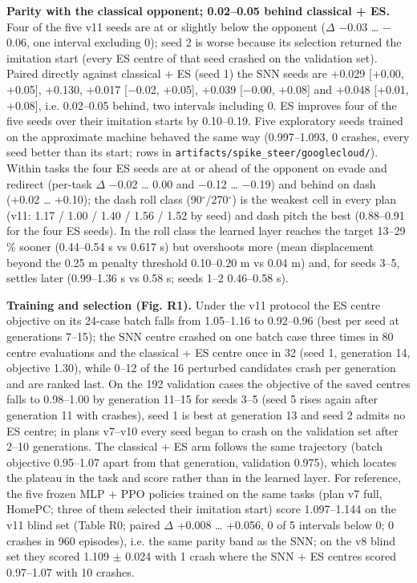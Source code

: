 \documentclass[10pt,a4paper]{article}
\begin{document}
\textbf{Parity with the classical opponent; 0.02--0.05 behind classical + ES.} Four of the five v11 seeds are at or slightly below the opponent ($\Delta$ $-$0.03 \ldots{} $-$0.06, one interval excluding 0); seed 2 is worse because its selection returned the imitation start (every ES centre of that seed crashed on the validation set). Paired directly against classical + ES (seed 1) the SNN seeds are +0.029 [+0.00, +0.05], +0.130, +0.017 [$-$0.02, +0.05], +0.039 [$-$0.00, +0.08] and +0.048 [+0.01, +0.08], i.e. 0.02--0.05 behind, two intervals including 0. ES improves four of the five seeds over their imitation starts by 0.10--0.19. Five exploratory seeds trained on the approximate machine behaved the same way (0.997--1.093, 0 crashes, every seed better than its start; rows in \texttt{artifacts/spike\_steer/googlecloud/}). Within tasks the four ES seeds are at or ahead of the opponent on evade and redirect (per-task $\Delta$ $-$0.02 \ldots{} 0.00 and $-$0.12 \ldots{} $-$0.19) and behind on dash (+0.02 \ldots{} +0.10); the dash roll class (90$^\circ$/270$^\circ$) is the weakest cell in every plan (v11: 1.17 / 1.00 / 1.40 / 1.56 / 1.52 by seed) and dash pitch the best (0.88--0.91 for the four ES seeds). In the roll class the learned layer reaches the target 13--29 \% sooner (0.44--0.54 s vs 0.617 s) but overshoots more (mean displacement beyond the 0.25 m penalty threshold 0.10--0.20 m vs 0.04 m) and, for seeds 3--5, settles later (0.99--1.36 s vs 0.58 s; seeds 1--2 0.46--0.58 s).

\textbf{Training and selection (Fig. R1).} Under the v11 protocol the ES centre objective on its 24-case batch falls from 1.05--1.16 to 0.92--0.96 (best per seed at generations 7--15); the SNN centre crashed on one batch case three times in 80 centre evaluations and the classical + ES centre once in 32 (seed 1, generation 14, objective 1.30), while 0--12 of the 16 perturbed candidates crash per generation and are ranked last. On the 192 validation cases the objective of the saved centres falls to 0.98--1.00 by generation 11--15 for seeds 3--5 (seed 5 rises again after generation 11 with crashes), seed 1 is best at generation 13 and seed 2 admits no ES centre; in plans v7--v10 every seed began to crash on the validation set after 2--10 generations. The classical + ES arm follows the same trajectory (batch objective 0.95--1.07 apart from that generation, validation 0.975), which locates the plateau in the task and score rather than in the learned layer. For reference, the five frozen MLP + PPO policies trained on the same tasks (plan v7 full, HomePC; three of them selected their imitation start) score 1.097--1.144 on the v11 blind set (Table R0; paired $\Delta$ +0.008 \ldots{} +0.056, 0 of 5 intervals below 0; 0 crashes in 960 episodes), i.e. the same parity band as the SNN; on the v8 blind set they scored 1.109 $\pm$ 0.024 with 1 crash where the SNN + ES centres scored 0.97--1.07 with 10 crashes.
\end{document}
